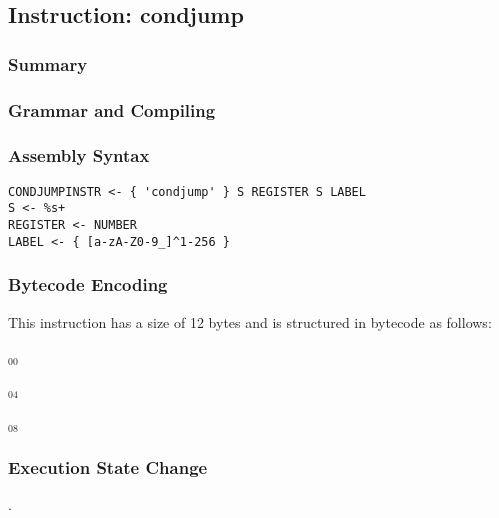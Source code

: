 \subsection{Instruction: condjump}

\subsubsection{Summary}


\subsubsection{Grammar and Compiling}


\subsubsection{Assembly Syntax}

\begin{myquote}
\begin{verbatim}
CONDJUMPINSTR <- { 'condjump' } S REGISTER S LABEL
S <- %s+
REGISTER <- NUMBER
LABEL <- { [a-zA-Z0-9_]^1-256 }
\end{verbatim}
\end{myquote}

\subsubsection{Bytecode Encoding}

This instruction has a size of 12 bytes and is structured in bytecode as follows:

$_{00}$\ 



$_{04}$\ 



$_{08}$\ 
\fbox{%
  \parbox{20pt}{%
00
  }%
}


\subsubsection{Execution State Change}

.


